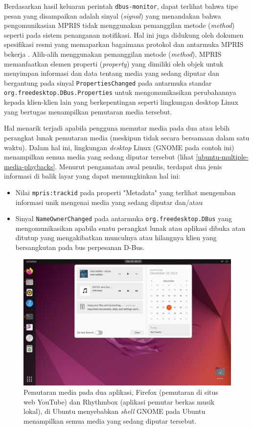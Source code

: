 Berdasarkan hasil keluaran perintah \verb|dbus-monitor|, dapat terlihat bahwa tipe pesan yang disampaikan adalah sinyal (\textit{signal}) yang menandakan bahwa pengomunikasian MPRIS tidak menggunakan pemanggilan metode (\textit{method}) seperti pada sistem penanganan notifikasi. Hal ini juga didukung oleh dokumen spesifikasi resmi yang memaparkan bagaimana protokol dan antarmuka MPRIS bekerja \cite{xdg-mpris-specification}. Alih-alih menggunakan pemanggilan metode (\textit{method}), MPRIS memanfaatkan elemen properti (\textit{property}) yang dimiliki oleh objek  untuk menyimpan informasi dan data tentang media yang sedang diputar dan bergantung pada sinyal \verb|PropertiesChanged| pada antarmuka standar \verb|org.freedesktop.DBus.Properties| untuk mengomunikasikan perubahannya kepada klien-klien lain yang berkepentingan seperti lingkungan desktop Linux yang bertugas menampilkan pemutaran media tersebut.

Hal menarik terjadi apabila pengguna memutar media pada dua atau lebih perangkat lunak pemutaran media (meskipun tidak secara bersamaan dalam satu waktu). Dalam hal ini, lingkungan \textit{desktop} Linux (GNOME pada contoh ini) menampilkan semua media yang sedang diputar tersebut (lihat \autoref{ubuntu-multiple-media-playbacks}. Menurut pengamatan awal penulis, terdapat dua jenis informasi di balik layar yang dapat memungkinkan hal ini:
\begin{itemize}
    \item Nilai \verb|mpris:trackid| pada properti "Metadata" yang terlihat mengemban informasi unik mengenai media yang sedang diputar dan/atau
    \item Sinyal \verb|NameOwnerChanged| pada antarmuka \verb|org.freedesktop.DBus| yang mengomunikasikan apabila suatu perangkat lunak atau aplikasi dibuka atau ditutup yang mengakibatkan munculnya atau hilangnya klien yang bersangkutan pada bus perpesanan D-Bus.
\end{itemize}

\begin{figure}
    \centering
    \includegraphics[width=1\linewidth]{assets/Screenshot from 2023-12-20 00-19-07.png}
    \caption{Pemutaran media pada dua aplikasi, Firefox (pemutaran di situs web YouTube) dan Rhythmbox (aplikasi pemutar berkas musik lokal), di Ubuntu menyebabkan \textit{shell} GNOME pada Ubuntu menampilkan semua media yang sedang diputar tersebut.}
    \label{ubuntu-multiple-media-playbacks}
\end{figure}

